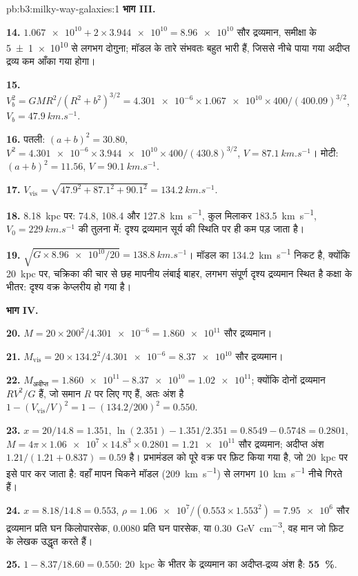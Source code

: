 \begin{solution}{pb:b3:milky-way-galaxies:1}
\textbf{भाग III.}

\textbf{14.} $\num{1.067e10} + 2\times\num{3.944e10} = \num{8.96e10}$ सौर
द्रव्यमान, समीक्षा के \num[separate-uncertainty=true]{5 \pm 1 e10} से लगभग दोगुना; मॉडल के तारे
संभवतः बहुत भारी हैं, जिससे नीचे पाया गया अदीप्त द्रव्य
कम आँका गया होगा।

\textbf{15.} $V_b^2 = GMR^2/(R^2 + b^2)^{3/2} = \num{4.301e-6}\times\num{1.067e10}
\times400/(400.09)^{3/2}$, $V_b = \qty{47.9}{km.s^{-1}}$.

\textbf{16.} पतली: $(a + b)^2 = 30.80$, $V^2 = \num{4.301e-6}\times\num{3.944e10}
\times400/(430.8)^{3/2}$, $V = \qty{87.1}{km.s^{-1}}$। मोटी:
$(a + b)^2 = 11.56$, $V = \qty{90.1}{km.s^{-1}}$.

\textbf{17.} $V_\mathrm{vis} = \sqrt{47.9^2 + 87.1^2 + 90.1^2} =
\qty{134.2}{km.s^{-1}}$.

\textbf{18.} \qty{8.18}{kpc} पर: 74.8, 108.4 और \qty{127.8}{km.s^{-1}},
कुल मिलाकर \qty{183.5}{km.s^{-1}}, $V_0 = \qty{229}{km.s^{-1}}$ की तुलना में:
दृश्य द्रव्यमान सूर्य की स्थिति पर ही कम पड़ जाता है।

\textbf{19.} $\sqrt{G\times\num{8.96e10}/20} = \qty{138.8}{km.s^{-1}}$। मॉडल का
\qty{134.2}{km.s^{-1}} निकट है, क्योंकि \qty{20}{kpc} पर,
चक्रिका की चार से छह मापनीय लंबाई बाहर, लगभग संपूर्ण दृश्य द्रव्यमान स्थित है
कक्षा के भीतर: दृश्य वक्र केप्लरीय हो गया है।

\textbf{भाग IV.}

\textbf{20.} $M = 20\times200^2/\num{4.301e-6} = \num{1.860e11}$ सौर द्रव्यमान।

\textbf{21.} $M_\mathrm{vis} = 20\times134.2^2/\num{4.301e-6} = \num{8.37e10}$
सौर द्रव्यमान।

\textbf{22.} $M_\text{अदीप्त} = \num{1.860e11} - \num{8.37e10} = \num{1.02e11}$;
क्योंकि दोनों द्रव्यमान $RV^2/G$ हैं, जो समान $R$ पर लिए गए हैं, अतः अंश है
$1 - (V_\mathrm{vis}/V)^2 = 1 - (134.2/200)^2 = \num{0.550}$.

\textbf{23.} $x = 20/14.8 = 1.351$, $\ln(2.351) - 1.351/2.351 = 0.8549 - 0.5748
= 0.2801$, $M = 4\pi\times\num{1.06e7}\times14.8^3\times0.2801 =
\num{1.21e11}$ सौर द्रव्यमान; अदीप्त अंश
$1.21/(1.21 + 0.837) = \num{0.59}$ है। प्रभामंडल को पूरे वक्र पर फ़िट किया गया है, जो
\qty{20}{kpc} पर इसे पार कर जाता है: वहाँ मापन
चिकने मॉडल (\qty{209}{km.s^{-1}}) से लगभग \qty{10}{km.s^{-1}} नीचे गिरते हैं।

\textbf{24.} $x = 8.18/14.8 = 0.553$, $\rho = \num{1.06e7}/(0.553\times1.553^2)
= \num{7.95e6}$ सौर द्रव्यमान प्रति घन किलोपारसेक, \num{0.0080} प्रति
घन पारसेक, या \qty{0.30}{GeV.cm^{-3}}, वह मान जो
फ़िट के लेखक उद्धृत करते हैं।

\textbf{25.} $1 - 8.37/18.60 = \num{0.550}$: \qty{20}{kpc} के भीतर के द्रव्यमान का अदीप्त-द्रव्य अंश
है:
\textbf{\qty[text-series-to-math=true]{55}{\percent}}.
\end{solution}
